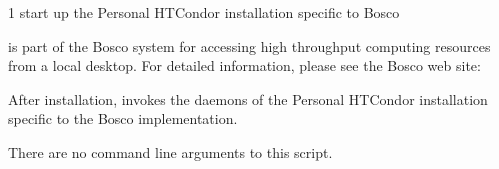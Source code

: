 \begin{ManPage}{\label{man-bosco-start}}{1}
{start up the Personal HTCondor installation specific to Bosco}


\Synopsis {}

\Description

 is part of the Bosco system for accessing high
throughput computing resources from a local desktop.
For detailed information, please see the Bosco web site:

After installation,  invokes the daemons of the
Personal HTCondor installation specific to the Bosco implementation.

There are no command line arguments to this script.


\end{ManPage}
